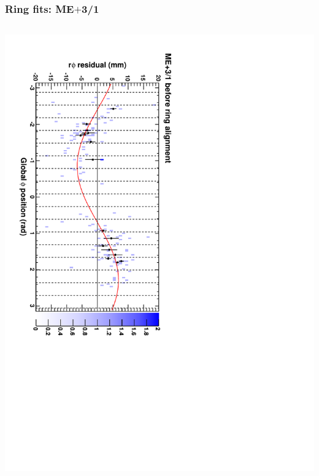 \documentclass[compress]{beamer}
\begin{document}
\begin{frame}
\frametitle{Ring fits: ME$+$3/1}
\vfill
\begin{columns}
\includegraphics[height=\linewidth, angle=90]{ringfits_before/mep31.pdf}


\end{columns}
\end{frame}
\end{document}
